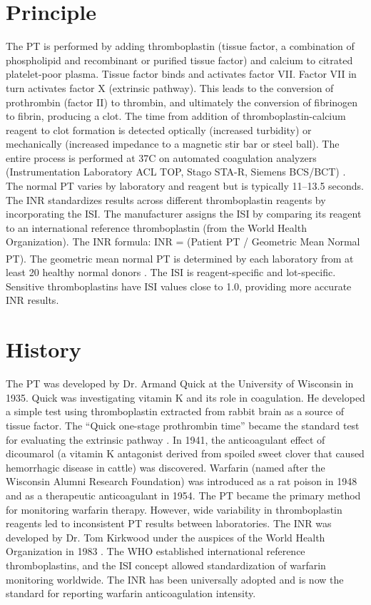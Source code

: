 \section*{Principle}
The PT is performed by adding thromboplastin (tissue factor, a combination of phospholipid and recombinant or purified tissue factor) and calcium to citrated platelet-poor plasma. Tissue factor binds and activates factor VII. Factor VII in turn activates factor X (extrinsic pathway). This leads to the conversion of prothrombin (factor II) to thrombin, and ultimately the conversion of fibrinogen to fibrin, producing a clot. The time from addition of thromboplastin-calcium reagent to clot formation is detected optically (increased turbidity) or mechanically (increased impedance to a magnetic stir bar or steel ball). The entire process is performed at 37\textdegree{}C on automated coagulation analyzers (Instrumentation Laboratory ACL TOP, Stago STA-R, Siemens BCS/BCT) \cite{tietz2012textbook}. The normal PT varies by laboratory and reagent but is typically 11--13.5 seconds. The INR standardizes results across different thromboplastin reagents by incorporating the ISI. The manufacturer assigns the ISI by comparing its reagent to an international reference thromboplastin (from the World Health Organization). The INR formula: INR = (Patient PT / Geometric Mean Normal PT)\textsuperscript{}. The geometric mean normal PT is determined by each laboratory from at least 20 healthy normal donors \cite{tripodi2008international}. The ISI is reagent-specific and lot-specific. Sensitive thromboplastins have ISI values close to 1.0, providing more accurate INR results.

\section*{History}
The PT was developed by Dr. Armand Quick at the University of Wisconsin in 1935. Quick was investigating vitamin K and its role in coagulation. He developed a simple test using thromboplastin extracted from rabbit brain as a source of tissue factor. The ``Quick one-stage prothrombin time'' became the standard test for evaluating the extrinsic pathway \cite{quick1935prothrombin}. In 1941, the anticoagulant effect of dicoumarol (a vitamin K antagonist derived from spoiled sweet clover that caused hemorrhagic disease in cattle) was discovered. Warfarin (named after the Wisconsin Alumni Research Foundation) was introduced as a rat poison in 1948 and as a therapeutic anticoagulant in 1954. The PT became the primary method for monitoring warfarin therapy. However, wide variability in thromboplastin reagents led to inconsistent PT results between laboratories. The INR was developed by Dr. Tom Kirkwood under the auspices of the World Health Organization in 1983 \cite{kirkwood1983calibration}. The WHO established international reference thromboplastins, and the ISI concept allowed standardization of warfarin monitoring worldwide. The INR has been universally adopted and is now the standard for reporting warfarin anticoagulation intensity.


